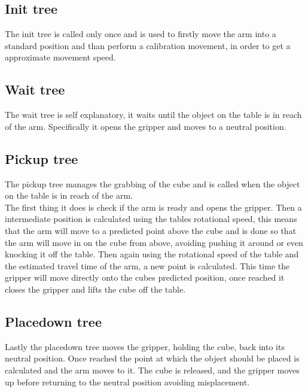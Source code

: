 \documentclass[report]{iisthesis}
\begin{document}
\subsection{Init tree}
The init tree is called only once and is used to firstly move the arm into a standard position and than perform a calibration movement, in order to get a approximate movement speed. 

\subsection{Wait tree}
The wait tree is self explanatory, it waits until the object on the table is in reach of the arm.
Specifically it opens the gripper and moves to a neutral position.

\subsection{Pickup tree}
The pickup tree manages the grabbing of the cube and is called when the object on the table is in reach of the arm. \\
The first thing it does is check if the arm is ready and opens the gripper. Then a intermediate position is calculated using the tables rotational speed, this means that the arm will move to a predicted point above the cube and is done
so that the arm will move in on the cube from above, avoiding pushing it around or even knocking it off the table. Then again using the rotational speed of the table and the estimated travel time of the arm, a new point is calculated.
This time the gripper will move directly onto the cubes predicted position, once reached it closes the gripper and lifts the cube off the table.

\subsection{Placedown tree}
Lastly the placedown tree moves the gripper, holding the cube, back into its neutral position. Once reached the point at which the object should be placed is calculated and the arm moves to it.
The cube is released, and the gripper moves up before returning to the neutral position avoiding misplacement.
\end{document}
